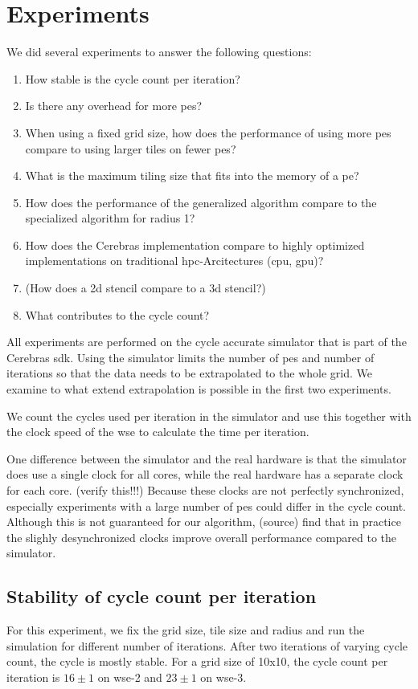 \chapter{Experiments}
We did several experiments to answer the following questions:
\begin{enumerate}
    \item How stable is the cycle count per iteration?
    \item Is there any overhead for more \acp{pe}?
    \item When using a fixed grid size, how does the performance of using more \acp{pe} compare to using larger tiles on fewer \acp{pe}?
    \item What is the maximum tiling size that fits into the memory of a \ac{pe}?
    \item How does the performance of the generalized algorithm compare to the specialized algorithm for radius 1?
    \item How does the Cerebras implementation compare to highly optimized implementations on traditional \ac{hpc}-Arcitectures (\ac{cpu}, \ac{gpu})?
    \item (How does a 2d stencil compare to a 3d stencil?)
    \item What contributes to the cycle count?
\end{enumerate}

All experiments are performed on the cycle accurate simulator that is part of the Cerebras \ac{sdk}.
Using the simulator limits the number of \acp{pe} and number of iterations so that the data needs to be extrapolated to the whole grid.
We examine to what extend extrapolation is possible in the first two experiments.

We count the cycles used per iteration in the simulator and use this together with the clock speed of the \ac{wse} to calculate the time per iteration.

One difference between the simulator and the real hardware is that the simulator does use a single clock for all cores, while the real hardware has a separate clock for each core. (verify this!!!) Because these clocks are not perfectly synchronized, especially experiments with a large number of \acp{pe} could differ in the cycle count. Although this is not guaranteed for our algorithm, (source) find that in practice the slighly desynchronized clocks improve overall performance compared to the simulator. 

\section{Stability of cycle count per iteration}
For this experiment, we fix the grid size, tile size and radius and run the simulation for different number of iterations.
After two iterations of varying cycle count, the cycle is mostly stable.
For a grid size of 10x10, the cycle count per iteration is $16\pm1$ on \ac{wse}-2 and $23\pm1$ on \ac{wse}-3.

